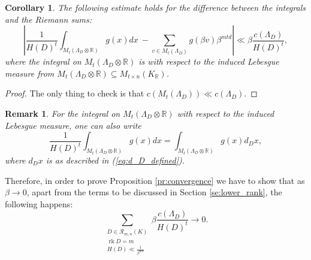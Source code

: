\documentclass{amsart}
\newtheorem{corollary}[theorem]{Corollary}
\newtheorem{remark}[theorem]{Remark}
\newcommand{\OK}{\mathcal{O}_K}
\DeclareMathOperator{\rank}{rk}
\begin{document}
\begin{corollary}
The following estimate holds for the difference between the integrals and the Riemann sums:
\begin{equation}
  \left |  \frac{1}{H(D)^{t}}   \int_{M_t(\Lambda_D \otimes \mathbb{R})} g(x) dx \  -\sum_{v \in M_t(\Lambda_D)} g(\beta v) \beta^{mtd} \right| \ll \beta \frac{c(\Lambda_D)}{ H(D)^{t}},
\end{equation}
where the integral on $M_{t}(\Lambda_D \otimes \mathbb{R})$ is with respect to the induced Lebesgue measure from $M_t( \Lambda_D \otimes \mathbb{R} ) \subseteq M_{t \times n}(K_\mathbb{R})$.
\end{corollary}
\begin{proof}
The only thing to check is that $c(M_t(\Lambda_D))\ll c(\Lambda_D)$.
\end{proof}

\begin{remark}
For the integral on $M_{t}(\Lambda_D \otimes \mathbb{R})$ with respect to the induced Lebesgue measure, one can also write
\begin{equation}
\frac{1}{H(D)^{t}}   \int_{M_t(\Lambda_D \otimes \mathbb{R})} g(x) dx
= 
\int_{M_{t}(\Lambda_D \otimes \mathbb{R})} g(x) d_D x,
\end{equation}
where $d_D x$ is as described in (\ref{eq:d_D_defined}).
\end{remark}


Therefore, in order to prove Proposition \ref{pr:convergence} we have to show that as $\beta \rightarrow 0$, apart from the 
terms to be discussed in Section \ref{se:lower_rank}, the following happens:
\begin{equation}
  \sum_{\substack{D \in \mathcal{R}_{m,n}(K) \\ \rank D = m  \\   H(D) \ll \frac{1}{\beta^{md}}}}  \beta\frac{c(\Lambda_{D})}{H(D)^{t}} \rightarrow 0.
\end{equation}
\end{document}
